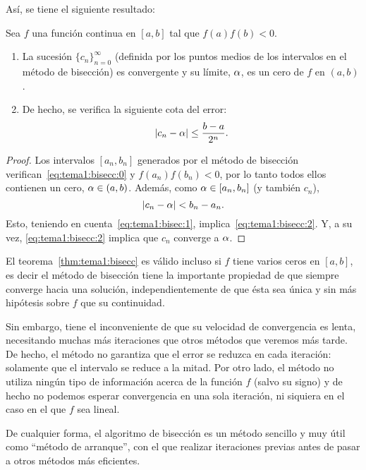 Así, se tiene el siguiente resultado:
\begin{theorem}
  \label{thm:tema1:bisecc}
  Sea $f$ una función continua en $[a,b]$ tal que $f(a)f(b)<0$.
  \begin{enumerate}
  \item La sucesión $\{c_n\}_{n=0}^\infty$ (definida por los puntos
    medios de los intervalos en el método de bisección) es convergente
    y su límite, $\alpha$, es un cero de $f$ en $(a,b)$.
  \item De hecho, se verifica la siguiente cota del error:
    \begin{equation}
      \label{eq:tema1:bisecc:2}
      |c_n-\alpha| \le \frac{b-a}{2^n}.
    \end{equation}
  \end{enumerate}
\end{theorem}

\begin{proof}
  Los intervalos $[a_n,b_n]$ generados por el método de bisección
  verifican~\eqref{eq:tema1:bisecc:0} y $f(a_n)f(b_n)<0$, por lo tanto
  todos ellos contienen un cero, $\alpha\in (a,b)$. Además, como
  $\alpha\in [a_n,b_n]$ (y también $c_n$),
  $$
  |c_n - \alpha| < b_n - a_n.
  $$
  Esto, teniendo en cuenta~\eqref{eq:tema1:bisec:1},
  implica~\eqref{eq:tema1:bisecc:2}. Y, a su vez,
  \eqref{eq:tema1:bisecc:2} implica que $c_n$ converge a $\alpha$.
\end{proof}

El teorema~\ref{thm:tema1:bisecc} es válido incluso si $f$ tiene
varios ceros en $[a,b]$, es decir el método de bisección tiene la
importante propiedad de que siempre converge hacia una solución,
independientemente de que ésta sea única y sin más hipótesis sobre $f$
que su continuidad.

Sin embargo, tiene el inconveniente de que su velocidad de
convergencia es lenta, necesitando muchas más iteraciones que otros
métodos que veremos más tarde. De hecho, el método no garantiza que el
error se reduzca en cada iteración: solamente que el intervalo se
reduce a la mitad. Por otro lado, el método no utiliza ningún tipo de
información acerca de la función $f$ (salvo su signo) y de hecho no
podemos esperar convergencia en una sola iteración, ni siquiera en el
caso en el que $f$ sea lineal.

De cualquier forma, el algoritmo de bisección es un método sencillo y
muy útil como ``método de arranque'', con el que realizar iteraciones
previas antes de pasar a otros métodos más eficientes.

